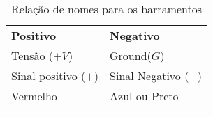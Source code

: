 \documentclass{article}
\newcommand{\topline}{ %
        \arrayrulecolor{rulecolor}\specialrule{0.1em}{\abovetopsep}{0pt}%
        \arrayrulecolor{tableheadcolor}\specialrule{\belowrulesep}{0pt}{0pt}%
        \arrayrulecolor{rulecolor}}
\newcommand{\midtopline}{ %
        \arrayrulecolor{tableheadcolor}\specialrule{\aboverulesep}{0pt}{0pt}%
        \arrayrulecolor{rulecolor}\specialrule{\lightrulewidth}{0pt}{0pt}%
        \arrayrulecolor{white}\specialrule{\belowrulesep}{0pt}{0pt}%
        \arrayrulecolor{rulecolor}}
\newcommand{\bottomline}{ %
        \arrayrulecolor{white}\specialrule{\aboverulesep}{0pt}{0pt}%
        \arrayrulecolor{rulecolor} %
        \specialrule{\heavyrulewidth}{0pt}{\belowbottomsep}}%
\newcommand{\midheader}[2]{%
        \midrule\topmidheader{#1}{#2}}
\newcommand\topmidheader[2]{\multicolumn{#1}{c}{\textsc{#2}}\\%
                \addlinespace[0.5ex]}
\begin{document}


\begin{table}[h]
\centering
\caption{Relação de nomes para os barramentos \label{tab:relacao_nomes_barramentos} }
\begin{tabular}{@{}ll@{}}
\toprule
\topline\rowcolor{tableheadcolor}

\textbf{Positivo}    &  \textbf{Negativo} \\  \midtopline
Tensão ($+V$)          & Ground($G$)            \\
Sinal positivo ($+$) & Sinal Negativo ($-$) \\
Vermelho             & Azul ou Preto        \\ \bottomline
\end{tabular}
\end{table}
\end{document}

